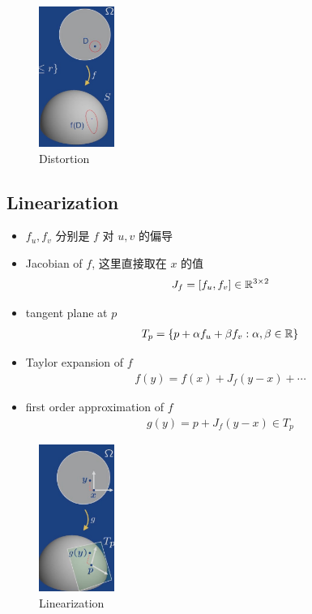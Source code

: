 \begin{figure}[!htb]
    \centering
    \includegraphics[width=0.22\textwidth]{pic/ACG2/Distortion}
    \caption{Distortion}
\end{figure}

\subsection{Linearization}
\begin{itemize}
    \item $f_u, f_v$ 分别是 $f$ 对 $u,v$ 的偏导
    \item Jacobian of $f$, 这里直接取在 $x$ 的值
    \begin{align*}
        J_f=\left[f_u, f_v\right]\in\mathbb{R}^{3\times 2}
    \end{align*}
    \item tangent plane at $p$
    \begin{align*}
        T_p=\{ p+\alpha f_u+\beta f_v: \alpha,\beta \in \mathbb{R} \}
    \end{align*}
    \item Taylor expansion of $f$
    \begin{align*}
        f(y)=f(x)+J_f(y-x)+\cdots
    \end{align*}
    \item first order approximation of $f$
    \begin{align*}
        g(y)=p+J_f(y-x)\in T_p
    \end{align*}
\end{itemize}

\begin{figure}[!htb]
    \centering
    \includegraphics[width=0.22\textwidth]{pic/ACG2/Linearization}
    \caption{Linearization}
\end{figure}

